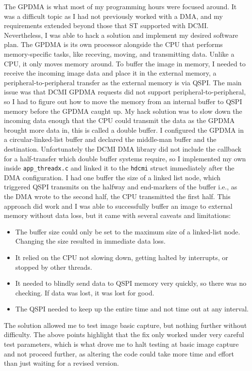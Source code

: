 The GPDMA is what most of my programming hours were focused around. It was a difficult topic as I had not previously worked with a DMA, and my requirements extended beyond those that ST supported with DCMI. Nevertheless, I was able to hack a solution and implement my desired software plan.
\nl
The GPDMA is its own processor alongside the CPU that performs memory-specific tasks, like receving, moving, and transmitting data. Unlike a CPU, it only moves memory around. To buffer the image in memory, I needed to receive the incoming image data and place it in the external memory, a peripheral-to-peripheral transfer as the external memory is via QSPI. The main issue was that DCMI GPDMA requests did not support peripheral-to-peripheral, so I had to figure out how to move the memory from an internal buffer to QSPI memory before the GPDMA caught up.
\nl
My hack solution was to slow down the incoming data enough that the CPU could transmit the data as the GPDMA brought more data in, this is called a double buffer. I configured the GPDMA in a circular-linked-list buffer and declared the middle-man buffer and the destination. Unfortunately the DCMI DMA library did not include the callback for a half-transfer which double buffer systems require, so I implemented my own inside \verb|app_threadx.c| and linked it to the \verb|hdcmi| struct immediately after the DMA configuration. I had one buffer the size of a linked list node, which triggered QSPI transmits on the halfway and end-markers of the buffer i.e., as the DMA wrote to the second half, the CPU transmitted the first half.
\nl
This approach did work and I was able to successfully buffer an image to external memory without data loss, but it came with several caveats and limitations:

\begin{itemize}
    \item The buffer size could only be set to the maximum size of a linked-list node. Changing the size resulted in immediate data loss.
    \item It relied on the CPU not slowing down, getting halted by interrupts, or stopped by other threads.
    \item It needed to blindly send data to QSPI memory very quickly, so there was no checking. If data was lost, it was lost for good.
    \item The QSPI needed to keep up the entire time and not time out at any interval.
\end{itemize}

The solution allowed me to test image basic capture, but nothing further without difficulty. The above points highlight that the fix only worked under very careful test parameters, which is what drove me to halt testing at basic image capture and not proceed further, as altering the code could take more time and effort than just waiting for a revised version.